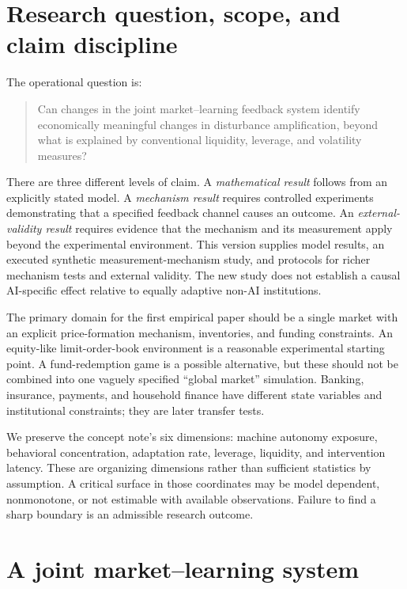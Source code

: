 \documentclass[11pt,a4paper]{article}
\theoremstyle{definition}
\theoremstyle{remark}
\begin{document}
\section{Research question, scope, and claim discipline}
\label{sec:scope}
The operational question is:
\begin{quote}
Can changes in the joint market--learning feedback system identify economically meaningful changes in disturbance amplification, beyond what is explained by conventional liquidity, leverage, and volatility measures?
\end{quote}
There are three different levels of claim. A \emph{mathematical result} follows from an explicitly stated model. A \emph{mechanism result} requires controlled experiments demonstrating that a specified feedback channel causes an outcome. An \emph{external-validity result} requires evidence that the mechanism and its measurement apply beyond the experimental environment. This version supplies model results, an executed synthetic measurement-mechanism study, and protocols for richer mechanism tests and external validity. The new study does not establish a causal AI-specific effect relative to equally adaptive non-AI institutions.

The primary domain for the first empirical paper should be a single market with an explicit price-formation mechanism, inventories, and funding constraints. An equity-like limit-order-book environment is a reasonable experimental starting point. A fund-redemption game is a possible alternative, but these should not be combined into one vaguely specified ``global market'' simulation. Banking, insurance, payments, and household finance have different state variables and institutional constraints; they are later transfer tests.

We preserve the concept note's six dimensions: machine autonomy exposure, behavioral concentration, adaptation rate, leverage, liquidity, and intervention latency. These are organizing dimensions rather than sufficient statistics by assumption. A critical surface in those coordinates may be model dependent, nonmonotone, or not estimable with available observations. Failure to find a sharp boundary is an admissible research outcome.

\section{A joint market--learning system}
\label{sec:model}
\end{document}
